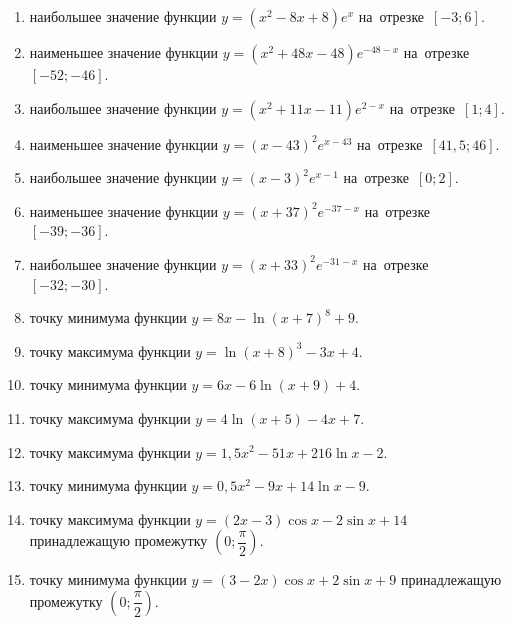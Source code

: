 \documentclass[a4paper,10pt]{article}
\begin{document}
\begin{enumerate}
\item {} наибольшее значение функции $y=\left(x^2 -8x +8\right)e^{x}$ на~отрезке~$\left[-3;6\right]$.

\item {} наименьшее значение функции $y=\left(x^2 +48x -48\right)e^{-48-x}$ на~отрезке~$\left[-52;-46\right]$.

\item {} наибольшее значение функции $y=\left(x^2 +11x -11\right)e^{2-x}$ на~отрезке~$\left[1;4\right]$.

\item {} наименьшее значение функции $y=\left(x-43\right)^2e^{x-43}$ на~отрезке~$\left[41,5;46\right]$.

\item {} наибольшее значение функции $y=\left(x-3\right)^2e^{x-1}$ на~отрезке~$\left[0;2\right]$.

\item {} наименьшее значение функции $y=\left(x+37\right)^2e^{-37-x}$ на~отрезке~$\left[-39;-36\right]$.

\item {} наибольшее значение функции $y=\left(x+33\right)^2e^{-31-x}$ на~отрезке~$\left[-32;-30\right]$.

\item {} точку минимума функции $y=8x-\ln\left(x+7\right)^{8}+9$.

\item {} точку максимума функции $y=\ln\left(x+8\right)^{3}-3x+4$.

\item {} точку минимума функции $y=6x-6\ln\left(x+9\right)+4$.

\item {} точку максимума функции $y=4\ln\left(x+5\right)-4x+7$.

\item {} точку максимума функции $y=1,5x^2-51x+216\ln x -2$.

\item {} точку минимума функции $y=0,5x^2-9x+14\ln x -9$.

\item {} точку максимума функции $y=\left(2x-3\right)\cos x -2\sin x+14$
принадлежащую промежутку $\left(0;\dfrac{\pi}{2}\right)$.

\item {} точку минимума функции $y=\left(3-2x\right)\cos x +2\sin x+9$
принадлежащую промежутку $\left(0;\dfrac{\pi}{2}\right)$.


\end{enumerate}
\end{document}
